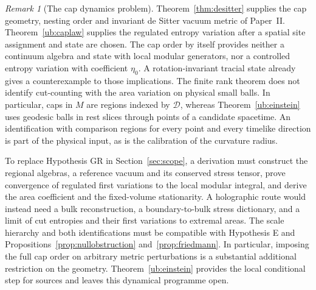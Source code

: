 \documentclass[aps,pra,onecolumn,superscriptaddress,nofootinbib,10pt]{revtex4-2}
\theoremstyle{definition}
\theoremstyle{remark}
\newtheorem{remark}[theorem]{Remark}
\begin{document}
\begin{remark}[The cap dynamics problem]\label{ub:programme}
Theorem~\ref{thm:desitter} supplies the cap geometry, nesting order
and invariant de Sitter vacuum metric of Paper~II.
Theorem~\ref{ub:caplaw} supplies the regulated entropy variation
after a spatial site assignment and state are chosen.
The cap order by itself provides neither a continuum algebra and
state with local modular generators, nor a controlled entropy
variation with coefficient $\eta_0$. A rotation-invariant tracial state
already gives a counterexample to those implications. The finite
rank theorem does not identify cut-counting with the area
variation on physical small balls. In particular, caps in $M$ are
regions indexed by $\mathcal D$, whereas Theorem~\ref{ub:einstein}
uses geodesic balls in rest slices through points of a candidate
spacetime. An identification with comparison regions for every
point and every timelike direction is part of the physical input,
as is the calibration of the curvature radius.

To replace Hypothesis GR in Section~\ref{sec:scope}, a derivation
must construct the regional algebras, a reference vacuum and its
conserved stress tensor, prove convergence of regulated first
variations to the local modular integral, and derive the area
coefficient and the fixed-volume stationarity. A holographic route
would instead need a bulk reconstruction, a boundary-to-bulk
stress dictionary, and a limit of cut entropies and their first
variations to extremal areas. The scale hierarchy and both
identifications must be compatible with Hypothesis E and
Propositions~\ref{prop:nullobstruction} and~\ref{prop:friedmann}.
In particular, imposing the full cap order on arbitrary metric
perturbations is a substantial additional restriction on the
geometry. Theorem~\ref{ub:einstein} provides the local conditional
step for sources and leaves this dynamical programme open.
\end{remark}
\end{document}
